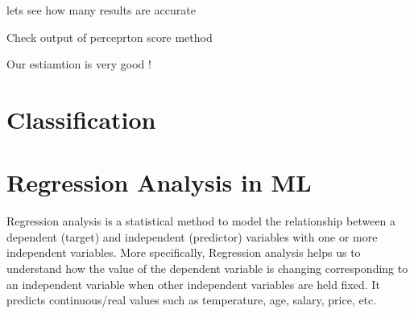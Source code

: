\documentclass[letterpaper,10pt,english]{sphinxmanual}
\begin{document}
\sphinxAtStartPar
lets see how many results are accurate

\begin{sphinxVerbatim}[commandchars=\\\{\}]
  

  \PYG{p}{[}\PYG{p}{]}



  

\end{sphinxVerbatim}

\begin{sphinxVerbatim}[commandchars=\\\{\}]
\end{sphinxVerbatim}

\sphinxAtStartPar
Check output of perceprton score method

\begin{sphinxVerbatim}[commandchars=\\\{\}]
\end{sphinxVerbatim}

\begin{sphinxVerbatim}[commandchars=\\\{\}]
\end{sphinxVerbatim}

\sphinxAtStartPar
Our estiamtion is very good !

\sphinxstepscope


\chapter{Classification}
\label{\detokenize{classification/classification:classification}}\label{\detokenize{classification/classification::doc}}
\sphinxstepscope


\chapter{Regression Analysis in ML}
\label{\detokenize{regression/regression:regression-analysis-in-ml}}\label{\detokenize{regression/regression::doc}}
\sphinxAtStartPar
Regression analysis is a statistical method to model the relationship between a dependent (target)
and independent (predictor) variables with one or more independent variables. More specifically,
Regression analysis helps us to understand how the value of the dependent variable is changing
corresponding to an independent variable when other independent variables are held fixed.
It predicts continuous/real values such as temperature, age, salary, price, etc.
\end{document}
